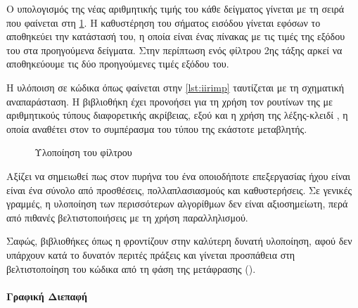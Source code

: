 \documentclass{article}
\begin{document}
Ο υπολογισμός της νέας αριθμητικής τιμής του κάθε δείγματος γίνεται με 
τη σειρά που φαίνεται στη \cref{fig:iir_filter_block}. 
Η καθυστέρηση του σήματος εισόδου γίνεται εφόσων το 
αποθηκεύει την κατάστασή του, η οποία είναι ένας πίνακας με τις τιμές της εξόδου 
του στα προηγούμενα δείγματα. Στην περίπτωση ενός φίλτρου 2ης τάξης 
αρκεί να αποθηκεύουμε τις δύο προηγούμενες τιμές εξόδου του.

Η υλόποιση σε κώδικα όπως φαίνεται στην \cref{lst:iirimp} ταυτίζεται με τη σχηματική 
αναπαράσταση. Η βιβλιοθήκη  έχει προνοήσει για τη χρήση τον ρουτίνων 
της με αριθμητικούς τύπους διαφορετικής ακρίβειας, εξού και η χρήση της 
λέξης-κλειδί  \cite{CppReferenceAuto}, η οποία αναθέτει στον  το συμπέρασμα του τύπου 
της εκάστοτε μεταβλητής.

\vspace{5mm}

\begin{figure}
\centering
    
\caption{Υλοποίηση του  φίλτρου}
\label{fig:iir_filter_block}

\end{figure}

\begin{minipage}{\textwidth}
\end{minipage}

Αξίζει να σημειωθεί πως στον πυρήνα του ένα οποιοδήποτε  επεξεργασίας 
ήχου είναι είναι ένα σύνολο από προσθέσεις, πολλαπλασιασμούς και καθυστερήσεις. 
Σε γενικές γραμμές, η υλοποίηση των περισσότερων 
αλγορίθμων δεν είναι αξιοσημείωτη, περά από πιθανές βελτιστοποιήσεις με τη χρήση παραλληλισμού. 

Σαφώς, βιβλιοθήκες όπως η  φροντίζουν στην καλύτερη δυνατή υλοποίηση, 
αφού δεν υπάρχουν κατά το δυνατόν περιτές πράξεις και γίνεται προσπάθεια 
στη βελτιστοποίηση του κώδικα από τη φάση της μετάφρασης ().

\paragraph{Γραφική Διεπαφή}

\epigraph{}{}
\end{document}

